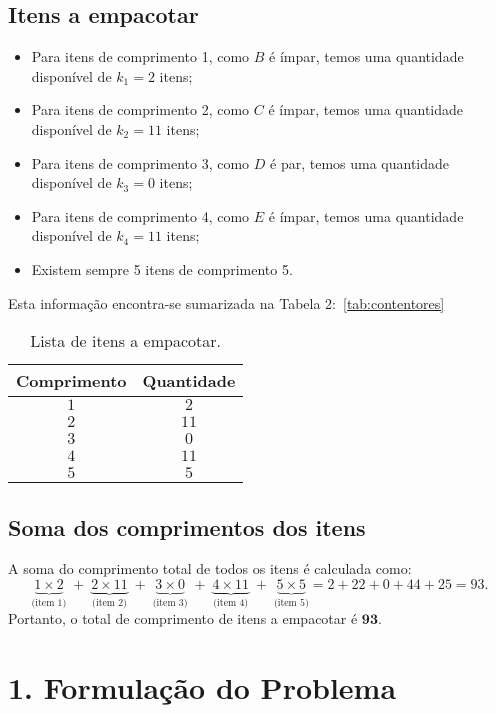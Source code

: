 \documentclass[a4paper,12pt]{article}
\begin{document}
\subsection*{Itens a empacotar}

\begin{itemize}
  \item Para itens de comprimento 1, como $B$ é ímpar, temos uma quantidade disponível de $k_1 = 2$ itens;
  \item Para itens de comprimento 2, como $C$ é ímpar, temos uma quantidade disponível de $k_2 = 11$ itens;
  \item Para itens de comprimento 3, como $D$ é par, temos uma quantidade disponível de $k_3 = 0$ itens;
  \item Para itens de comprimento 4, como $E$ é ímpar, temos uma quantidade disponível de $k_4 = 11$ itens;
  \item Existem sempre 5 itens de comprimento 5.
\end{itemize}

Esta informação encontra-se sumarizada na Tabela 2:~\ref{tab:contentores}

\begin{table}[H]
\centering
\label{tab:itens}
\begin{tabular}{@{}c c@{}}
\toprule
\textbf{Comprimento} & \textbf{Quantidade} \\
\midrule
$1$ & $2$ \\
$2$ & $11$\\
$3$ & $0$ \\
$4$ & $11$\\
$5$ & $5$ \\
\bottomrule
\end{tabular}
\caption{Lista de itens a empacotar.}
\end{table}

\subsection*{Soma dos comprimentos dos itens}

A soma do comprimento total de todos os itens é calculada como:
\[
\underbrace{1 \times 2}_{\text{(item 1)}} \;+\;
\underbrace{2 \times 11}_{\text{(item 2)}} \;+\;
\underbrace{3 \times 0}_{\text{(item 3)}} \;+\;
\underbrace{4 \times 11}_{\text{(item 4)}} \;+\;
\underbrace{5 \times 5}_{\text{(item 5)}} 
= 2 + 22 + 0 + 44 + 25 
= 93.
\]
Portanto, o total de comprimento de itens a empacotar é $\mathbf{93}$.


\section*{1. Formulação do Problema}
\end{document}
